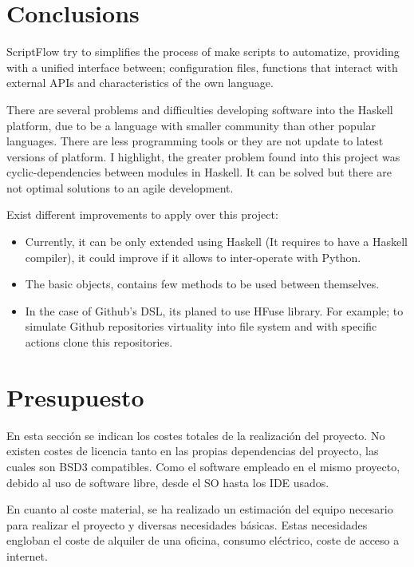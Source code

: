 \documentclass[11pt]{article}
\begin{document}
\section{Conclusions}
\label{sec:org7f141f3}

ScriptFlow try to simplifies the process of make scripts to automatize, providing with a unified interface between; configuration files, functions that interact with external APIs and
characteristics of the own language.

There are several problems and difficulties developing software into the Haskell platform, due to be a language with smaller community than other popular languages. There are less programming
tools or they are not update to latest versions of platform. I highlight, the greater problem found into this project was cyclic-dependencies between modules in Haskell. It can be solved but there are not optimal
solutions to an agile development.

Exist different improvements to apply over this project:
\begin{itemize}
\item Currently, it can be only extended using Haskell (It requires to have a Haskell compiler), it could improve if it allows to inter-operate with Python.
\item The basic objects, contains few methods to be used between themselves.
\item In the case of Github's DSL, its planed to use HFuse library. For example; to simulate Github repositories virtuality into file system and with specific actions clone this repositories.
\end{itemize}

\section{Presupuesto}
\label{sec:org1fdf17a}

En esta sección se indican los costes totales de la realización del proyecto. No existen costes de
licencia tanto en las propias dependencias del proyecto, las cuales son BSD3 compatibles. Como el software
empleado en el mismo proyecto, debido al uso de software libre, desde el SO hasta los IDE usados.

En cuanto al coste material, se ha realizado un estimación del equipo necesario para realizar el proyecto y diversas necesidades básicas.
Estas necesidades engloban el coste de alquiler de una oficina, consumo eléctrico, coste de acceso a internet.
\end{document}

